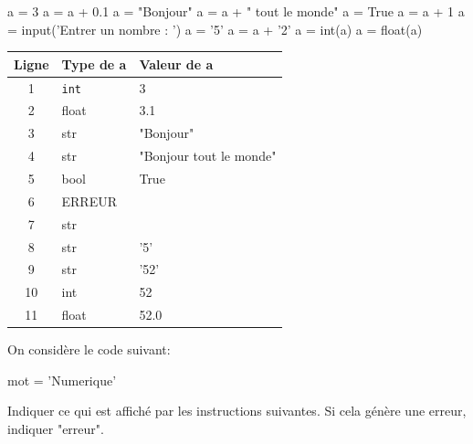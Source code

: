 \documentclass[a4paper,10pt]{report}
\renewcommand{\arraystretch}{1}  %
\def\ptsexoD{3}
\begin{document}
\begin{minipage}{0.49\linewidth}

\begin{CodePythontexAlt}[TaillePolice=\large,Largeur=1\linewidth,Centre,PremLigne=1]{}
a = 3
a = a + 0.1
a = "Bonjour"
a = a + " tout le monde"
a = True
a = a + 1
a = input('Entrer un nombre : ')
a = '5'
a = a + '2'
a = int(a)
a = float(a)

\end{CodePythontexAlt}

\end{minipage}\hfill
\begin{minipage}{0.46\linewidth}
    
    \medskip

    \renewcommand{\arraystretch}{1.2}
    \begin{tabular}{|c|p{2cm}|p{5cm}|}
        \hline
        Ligne& Type de a & Valeur de a\\ \hline
        1& \verb|int|&3\\\hline
        2&float&3.1\\\hline
        3&str&"Bonjour"\\\hline
        4&str&"Bonjour tout le monde"\\\hline
        5&bool&True\\\hline
        6&ERREUR&\\\hline
        7&str&\\\hline
        8&str&'5'\\\hline
        9&str&'52'\\\hline
        10&int&52\\\hline
        11&float&52.0\\\hline


    \end{tabular}
\end{minipage}


\pagebreak
\pagestyle{DS_LP}
\exods{\ptsexoD}

On considère le code suivant:

\begin{CodePythontexAlt}[TaillePolice=\large,Largeur=1\linewidth,Centre,PremLigne=1]{}
mot = 'Numerique'
\end{CodePythontexAlt}


Indiquer ce qui est affiché par les instructions suivantes. Si cela génère une erreur, indiquer "erreur".
\end{document}
